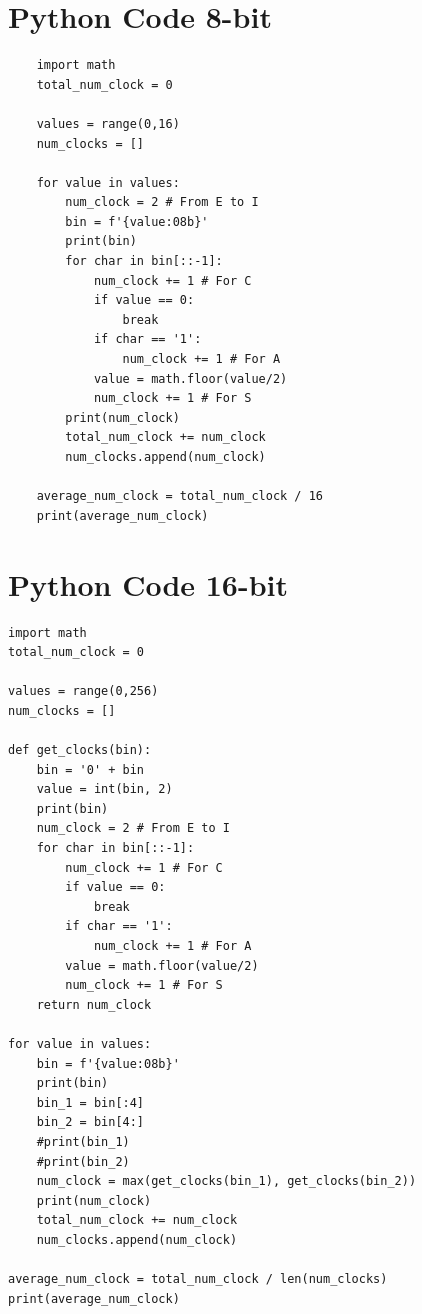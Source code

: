 \documentclass[11pt]{article}
\begin{document}
\pagebreak
\appendix
\section{Python Code 8-bit} 
\begin{lstlisting}
    import math
    total_num_clock = 0
    
    values = range(0,16)
    num_clocks = []
    
    for value in values:
        num_clock = 2 # From E to I
        bin = f'{value:08b}'
        print(bin)
        for char in bin[::-1]:
            num_clock += 1 # For C
            if value == 0:
                break
            if char == '1':
                num_clock += 1 # For A
            value = math.floor(value/2)
            num_clock += 1 # For S
        print(num_clock)
        total_num_clock += num_clock
        num_clocks.append(num_clock)
    
    average_num_clock = total_num_clock / 16
    print(average_num_clock)
\end{lstlisting}

\section{Python Code 16-bit} 
\begin{lstlisting}
import math
total_num_clock = 0

values = range(0,256)
num_clocks = []

def get_clocks(bin):
    bin = '0' + bin
    value = int(bin, 2)
    print(bin)
    num_clock = 2 # From E to I
    for char in bin[::-1]:
        num_clock += 1 # For C
        if value == 0:
            break
        if char == '1':
            num_clock += 1 # For A
        value = math.floor(value/2)
        num_clock += 1 # For S
    return num_clock

for value in values:
    bin = f'{value:08b}'
    print(bin)
    bin_1 = bin[:4]
    bin_2 = bin[4:]
    #print(bin_1)
    #print(bin_2)
    num_clock = max(get_clocks(bin_1), get_clocks(bin_2))
    print(num_clock)
    total_num_clock += num_clock
    num_clocks.append(num_clock)

average_num_clock = total_num_clock / len(num_clocks)
print(average_num_clock)
\end{lstlisting}


\pagebreak
\printbibliography
\end{document}
